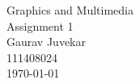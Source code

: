\documentclass[a4paper,14pt,english,crop=false]{standalone}
\begin{document}
\begin{titlepage}
\begin{center}
  {Graphics and Multimedia \\}
  \LARGE{Assignment 1 \\}
  \horrule{0.4pt}
  \large{Gaurav Juvekar \\}
  \large{111408024 \\}
  \normalsize{\today{}}
\end{center}
\horrule{1pt}
\end{titlepage}
\end{document}
